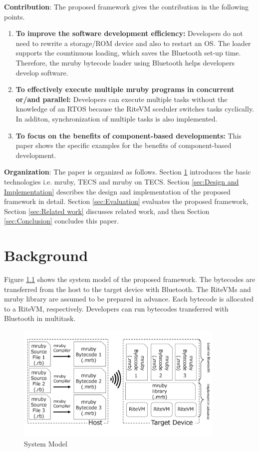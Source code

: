 \documentclass[a4j,12pt,oneside,openany,english]{jsbook}
\begin{document}
{\bf Contribution}: The proposed framework gives the contribution in the following points.
\begin{enumerate}
\item {\bf To improve the software development efficiency:} Developers do not need to rewrite a storage/ROM device and also to restart an OS.
The loader supports the countinuous loading, which saves the Bluetooth set-up time.
Therefore, the mruby bytecode loader using Bluetooth helps developers develop software.
\item {\bf To effectively execute multiple mruby programs in concurrent or/and parallel:} Developers can execute multiple tasks without the knowledge of an RTOS because the RiteVM sceduler switches tasks cyclically.
In additon, synchronization of multiple tasks is also implemented.
\item {\bf To focus on the benefits of component-based developments:} This paper shows the specific examples for the benefits of component-based development. 
\end{enumerate}

{\bf Organization}: The paper is organized as follows.
Section \ref{sec:Background} introduces the basic technologies i.e. mruby, TECS and mruby on TECS.
Section \ref{sec:Design and Implementation} describes the design and implementation of the proposed framework in detail.
Section \ref{sec:Evaluation} evaluates the proposed framework, Section \ref{sec:Related work} discusses related work, and then Section \ref{sec:Conclusion} concludes this paper.

\chapter{Background}
\label{sec:Background}
Figure \ref{fig:proposed} shows the system model of the proposed framework.
The bytecodes are transferred from the host to the target device with Bluetooth.
The RiteVMs and mruby library are assumed to be prepared in advance.
Each bytecode is allocated to a RiteVM, respectively.
Developers can run bytecodes transferred with Bluetooth in multitask.

\begin{figure}[t]
    \centering
    \includegraphics[width=10cm,clip]{../EMSOFT2016/figure/proposed.pdf}
    \caption{System Model}
    \label{fig:proposed}
\end{figure}
\end{document}
